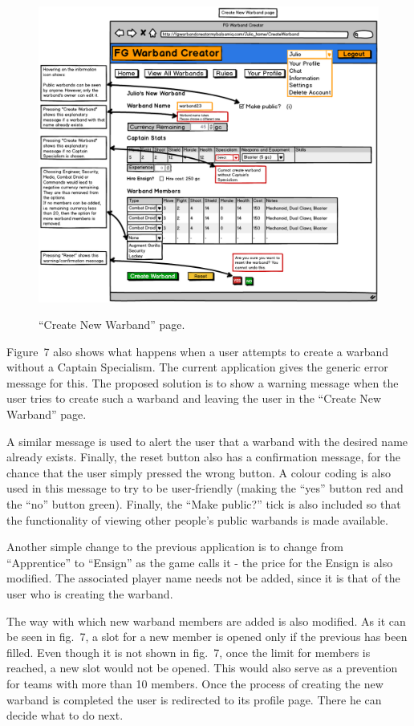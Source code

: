 \documentclass[12pt,a4paper]{article}
\begin{document}
\begin{figure}[h!]
 \centering
 \includegraphics[width=1\textwidth]{img/create_restricted}
 \label{fig:7}
 \caption{``Create New Warband'' page.}
\end{figure}

Figure~7 also shows what happens when a user attempts to create a warband without a Captain Specialism. The current application gives the generic error message for this. The proposed solution is to show a warning message when the user tries to create such a warband and leaving the user in the ``Create New Warband'' page. 

A similar message is used to alert the user that a warband with the desired name already exists. Finally, the reset button also has a confirmation message, for the chance that the user simply pressed the wrong button. A colour coding is also used in this message to try to be user-friendly (making the ``yes'' button red and the ``no'' button green). Finally, the ``Make public?'' tick is also included so that the functionality of viewing other people's public warbands is made available. 

Another simple change to the previous application is to change from ``Apprentice'' to ``Ensign'' as the game calls it - the price for the Ensign is also modified. The associated player name needs not be added, since it is that of the user who is creating the warband.

The way with which new warband members are added is also modified. As it can be seen in fig.~7, a slot for a new member is opened only if the previous has been filled. Even though it is not shown in fig.~7, once the limit for members is reached, a new slot would not be opened. This would also serve as a prevention for teams with more than 10 members. Once the process of creating the new warband is completed the user is redirected to its profile page. There he can decide what to do next. 
\end{document}
